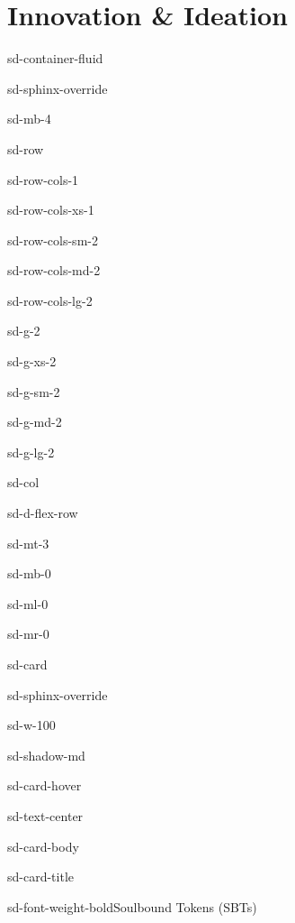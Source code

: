 \documentclass[letterpaper,10pt,english]{jupyterBook}
\begin{document}
\chapter{Innovation \& Ideation}
\label{\detokenize{STRUCTURE/innovation_2:innovation-ideation}}\label{\detokenize{STRUCTURE/innovation_2::doc}}
\begin{sphinxuseclass}{sd-container-fluid}
\begin{sphinxuseclass}{sd-sphinx-override}
\begin{sphinxuseclass}{sd-mb-4}
\begin{sphinxuseclass}{sd-row}
\begin{sphinxuseclass}{sd-row-cols-1}
\begin{sphinxuseclass}{sd-row-cols-xs-1}
\begin{sphinxuseclass}{sd-row-cols-sm-2}
\begin{sphinxuseclass}{sd-row-cols-md-2}
\begin{sphinxuseclass}{sd-row-cols-lg-2}
\begin{sphinxuseclass}{sd-g-2}
\begin{sphinxuseclass}{sd-g-xs-2}
\begin{sphinxuseclass}{sd-g-sm-2}
\begin{sphinxuseclass}{sd-g-md-2}
\begin{sphinxuseclass}{sd-g-lg-2}
\begin{sphinxuseclass}{sd-col}
\begin{sphinxuseclass}{sd-d-flex-row}
\begin{sphinxuseclass}{sd-mt-3}
\begin{sphinxuseclass}{sd-mb-0}
\begin{sphinxuseclass}{sd-ml-0}
\begin{sphinxuseclass}{sd-mr-0}
\begin{sphinxuseclass}{sd-card}
\begin{sphinxuseclass}{sd-sphinx-override}
\begin{sphinxuseclass}{sd-w-100}
\begin{sphinxuseclass}{sd-shadow-md}
\begin{sphinxuseclass}{sd-card-hover}
\begin{sphinxuseclass}{sd-text-center}
\begin{sphinxuseclass}{sd-card-body}
\begin{sphinxuseclass}{sd-card-title}
\begin{sphinxuseclass}{sd-font-weight-bold}Soulbound Tokens (SBTs)
\end{sphinxuseclass}
\end{sphinxuseclass}



\end{sphinxuseclass}
\end{sphinxuseclass}
\end{sphinxuseclass}
\end{sphinxuseclass}
\end{sphinxuseclass}
\end{sphinxuseclass}
\end{sphinxuseclass}
\end{sphinxuseclass}
\end{sphinxuseclass}
\end{sphinxuseclass}
\end{sphinxuseclass}
\end{sphinxuseclass}
\end{sphinxuseclass}
\end{sphinxuseclass}
\end{sphinxuseclass}
\end{sphinxuseclass}
\end{sphinxuseclass}
\end{sphinxuseclass}
\end{sphinxuseclass}
\end{sphinxuseclass}
\end{sphinxuseclass}
\end{sphinxuseclass}
\end{sphinxuseclass}
\end{sphinxuseclass}
\end{sphinxuseclass}
\end{sphinxuseclass}
\end{sphinxuseclass}
\end{document}
